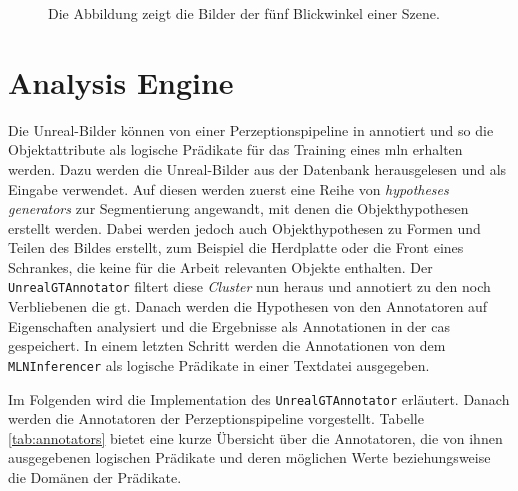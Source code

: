 \begin{figure}
\begin{subfigure}[b]{0.3\textwidth}
	\end{subfigure}
\caption[Unreal-Bilder einer Szene]{Die Abbildung zeigt die Bilder der fünf Blickwinkel einer Szene.}
\label{fig:exampleScene}
\end{figure}

\section{Analysis Engine}
\label{sec:analysisengine}
Die Unreal-Bilder können  von einer Perzeptionspipeline in \robosherlock annotiert und so die Objektattribute als logische Prädikate für das Training eines \gls{mln} erhalten werden. Dazu werden die Unreal-Bilder aus der Datenbank herausgelesen und als Eingabe verwendet. Auf diesen werden zuerst eine Reihe von \textit{hypotheses generators} zur Segmentierung angewandt, mit denen die Objekthypothesen erstellt werden. Dabei werden jedoch auch Objekthypothesen zu Formen und Teilen des Bildes erstellt, zum Beispiel die Herdplatte oder die Front eines Schrankes, die keine für die Arbeit relevanten Objekte enthalten. Der \texttt{UnrealGTAnnotator} filtert diese \textit{Cluster} nun heraus und annotiert zu den noch Verbliebenen die \gls{gt}. Danach werden die Hypothesen von den Annotatoren auf Eigenschaften analysiert und die Ergebnisse als Annotationen in der \gls{cas} gespeichert. In einem letzten Schritt werden die Annotationen von dem \texttt{MLNInferencer} als logische Prädikate in einer Textdatei ausgegeben. \par 

Im Folgenden wird die Implementation des \texttt{UnrealGTAnnotator} erläutert. Danach werden die Annotatoren der Perzeptionspipeline vorgestellt. Tabelle \ref{tab:annotators} bietet eine kurze Übersicht über die Annotatoren, die von ihnen ausgegebenen logischen Prädikate und deren möglichen Werte beziehungsweise die Domänen der Prädikate.

